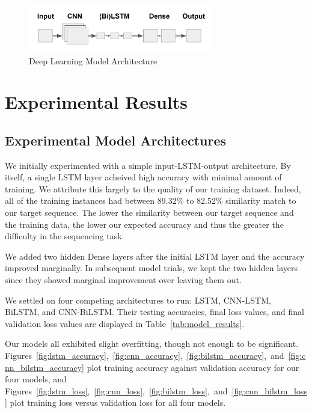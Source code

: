 \documentclass[journal]{IEEEtran}
\begin{document}
  \begin{figure}[h]
    \centering
    \includegraphics[width=8cm]{figures/model_architectures.png}
    \caption{Deep Learning Model Architecture}
    \label{fig:model_architectures}
  \end{figure}

\section{Experimental Results}
  \subsection{Experimental Model Architectures}

    We initially experimented with a simple input-LSTM-output architecture. By itself, a single LSTM layer acheived high
    accuracy with minimal amount of training. We attribute this largely to the quality of our
    training dataset. Indeed, all of the training instances had between 89.32\% to 82.52\% similarity
    match to our target sequence. The lower the similarity between our target sequence and the training
    data, the lower our expected accuracy and thus the greater the difficulty in the sequencing task.

    We added two hidden Dense layers after the initial LSTM layer and the accuracy improved marginally.
    In subsequent model trials, we kept the two hidden layers since they showed marginal improvement
    over leaving them out.

    We settled on four competing architectures to run: LSTM, CNN-LSTM, BiLSTM, and CNN-BiLSTM.
    Their testing accuracies, final loss values, and final validation loss values are displayed
    in Table~\ref{tab:model_results}.

    Our models all exhibited slight overfitting, though not enough to be significant.
    Figures~\ref{fig:lstm_accuracy},~\ref{fig:cnn_accuracy},~\ref{fig:bilstm_accuracy},~and~\ref{fig:cnn_bilstm_accuracy}
    plot training accuracy against validation accuracy for our four models, and 
    Figures~\ref{fig:lstm_loss},~\ref{fig:cnn_loss},~\ref{fig:bilstm_loss},~and~\ref{fig:cnn_bilstm_loss}
    plot training loss versus validation loss for all four models.
\end{document}
